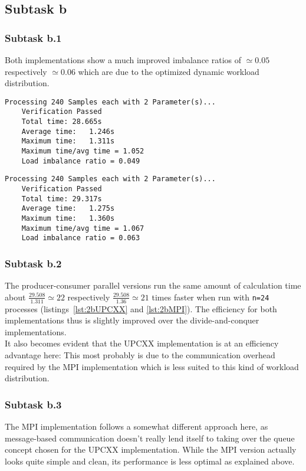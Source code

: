 \documentclass[11pt,a4paper]{article}
\begin{document}
\subsection{Subtask b}
\subsubsection{Subtask b.1}
Both implementations show a much improved imbalance ratios of $\simeq 0.05$ respectively $\simeq 0.06$ which are due to
the optimized dynamic workload distribution.


\begin{lstlisting}[basicstyle=\tiny, frame=single, caption={Task 2b: UPCXX producer-consumer parallel implementation output (n=24).}, label={lst:2bUPCXX}]
	Processing 240 Samples each with 2 Parameter(s)...
	Verification Passed
	Total time:	28.665s
	Average time:	1.246s
	Maximum time:	1.311s
	Maximum time/avg time = 1.052
	Load imbalance ratio = 0.049	
\end{lstlisting}

\begin{lstlisting}[basicstyle=\tiny, frame=single, caption={Task 2b: MPI producer-consumer parallel implementation output (n=24).}, label={lst:2bMPI}]
	Processing 240 Samples each with 2 Parameter(s)...
	Verification Passed
	Total time:	29.317s
	Average time:	1.275s
	Maximum time:	1.360s
	Maximum time/avg time = 1.067
	Load imbalance ratio = 0.063	
\end{lstlisting}

\subsubsection{Subtask b.2}
The producer-consumer parallel versions run the same amount of calculation time about $\frac{29.508}{1.311}\simeq 22$ respectively $\frac{29.508}{1.36}\simeq 21$ times
faster when run with \texttt{n=24} processes (listings~\ref{lst:2bUPCXX} and \ref{lst:2bMPI}). The efficiency for 
both implementations thus is slightly improved over the divide-and-conquer implementations.\\
It also becomes evident that the UPCXX implementation is at an efficiency advantage here: This most probably
is due to the communication overhead required by the MPI implementation which is less suited to this kind of workload distribution.

\subsubsection{Subtask b.3}
The MPI implementation follows a somewhat different approach here, as message-based communication doesn't really 
lend itself to taking over the queue concept chosen for the UPCXX implementation. While the MPI version actually
looks quite simple and clean, its performance is less optimal as explained above.
\end{document}
